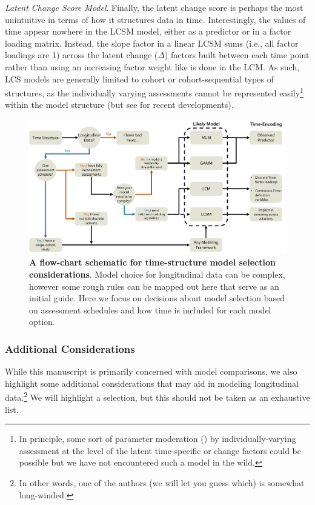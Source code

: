 \documentclass[11pt]{article}
\begin{document}
\qquad \textit{Latent Change Score Model}. Finally, the latent change score is perhaps the most unintuitive in terms of how it structures data in time. Interestingly, the values of time appear nowhere in the LCSM model, either as a predictor or in a factor loading matrix. Instead, the slope factor in a linear LCSM sums (i.e., all factor loadings are 1) across the latent change ($\Delta$) factors built between each time point rather than using an increasing factor weight like is done in the LCM. As such, LCS models are generally limited to cohort or cohort-sequential types of structures, as the individually varying assessments cannot be represented easily\footnote{In principle, some sort of parameter moderation (\cite{bauer_more_2017}) by individually-varying assessment at the level of the latent time-specific or change factors could be possible but we have not encountered such a model in the wild.} within the model structure (but see \cite{estrada_controlling_2022} for recent developments).

\begin{figure}[H]
    \centering
    \includegraphics[width = 1\textwidth]{figures/Figure 1.pdf}
    \caption{\textbf{A flow-chart schematic for time-structure model selection considerations}. Model choice for longitudinal data can be complex, however some rough rules can be mapped out here that serve as an initial guide. Here we focus on decisions about model selection based on assessment schedules and how time is included for each model option.}
    \label{fig:timeFig}
\end{figure}

\subsubsection{Additional Considerations}
While this manuscript is primarily concerned with model comparisons, we also highlight some additional considerations that may aid in modeling longitudinal data.\footnote{In other words, one of the authors (we will let you guess which) is somewhat long-winded.} We will highlight a selection, but this should not be taken as an exhaustive list.
\end{document}
